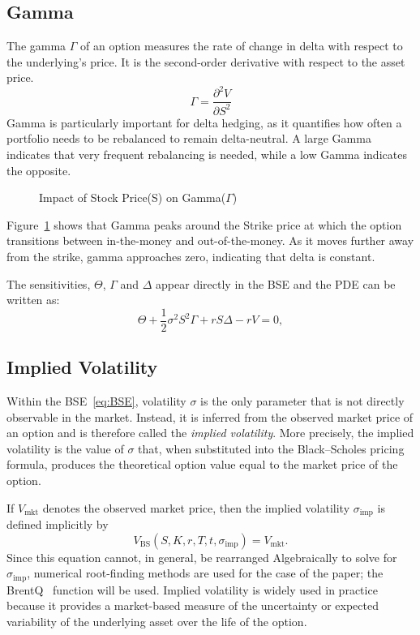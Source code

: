 \documentclass[11pt]{report}
\begin{document}
\subsection{Gamma}
The gamma $\Gamma$ of an option measures the rate of change 
in delta with respect to the underlying's price. 
It is the second-order derivative with respect to the asset price. 
\begin{equation}
    \Gamma =\frac{\partial^2 V}{\partial S^2}
\end{equation}
Gamma is particularly important for delta hedging, as it 
quantifies how often a portfolio needs to be rebalanced to 
remain delta-neutral. A large Gamma indicates that
very frequent rebalancing is needed, while a low Gamma indicates the opposite. 
\begin{figure}[H]
    \centering
    \scalebox{0.72}{}
    \caption{Impact of Stock Price(S) on Gamma($\Gamma$)}
    \label{fig:gamma_greek}
\end{figure}
Figure~\ref{fig:gamma_greek} shows that Gamma peaks around the Strike 
price at which the option transitions between in-the-money and out-of-the-money. As it moves further away from the strike, 
gamma approaches zero, indicating that delta is constant. 

The sensitivities, $\Theta$, $\Gamma$ and $\Delta$ appear 
directly in the BSE and the PDE can be written as:
\begin{equation}
    \Theta
+ \frac{1}{2}\sigma^2 S^2 \Gamma
+ rS\Delta
- rV = 0,
\end{equation}

\subsection{Implied Volatility}
Within the BSE~\ref{eq:BSE}, volatility $\sigma$ is the only 
parameter that is not directly observable in the market. 
Instead, it is inferred from the observed market price of 
an option and is therefore called the \textit{implied volatility}. 
More precisely, the implied volatility is the value of $\sigma$ that, 
when substituted into the Black--Scholes pricing formula, produces the theoretical option value equal to the market price of the option.

If $V_{\text{mkt}}$ denotes the observed market price, 
then the implied volatility $\sigma_{\text{imp}}$ is defined implicitly by
\begin{equation}
V_{\text{BS}}\left(S,K,r,T,t,\sigma_{\text{imp}}\right) = V_{\text{mkt}}.
\end{equation}
Since this equation cannot, in general, be rearranged
Algebraically to solve for $\sigma_{\text{imp}}$, numerical root-finding methods are used for the case of the paper; the BrentQ~\cite{scipy_brentq} function will be used. 
Implied volatility is widely used in practice because it 
provides a market-based measure of the uncertainty or expected 
variability of the underlying asset over the life of the option.
\end{document}
